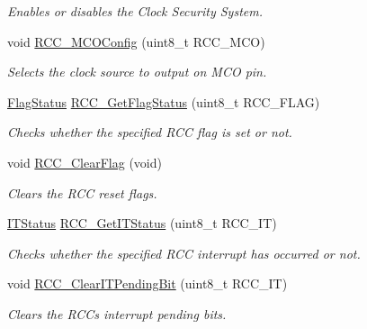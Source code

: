 \begin{DoxyCompactItemize}
\begin{DoxyCompactList}\small\item\em Enables or disables the Clock Security System. \end{DoxyCompactList}\item 
void \mbox{\hyperlink{group___r_c_c___private___functions_ga8f62b86c6ca8ae6585ba1cec79431fe5}{R\+C\+C\+\_\+\+M\+C\+O\+Config}} (uint8\+\_\+t R\+C\+C\+\_\+\+M\+CO)
\begin{DoxyCompactList}\small\item\em Selects the clock source to output on M\+CO pin. \end{DoxyCompactList}\item 
\mbox{\hyperlink{group___exported__types_ga89136caac2e14c55151f527ac02daaff}{Flag\+Status}} \mbox{\hyperlink{group___r_c_c___private___functions_ga2897bdc52f272031c44fb1f72205d295}{R\+C\+C\+\_\+\+Get\+Flag\+Status}} (uint8\+\_\+t R\+C\+C\+\_\+\+F\+L\+AG)
\begin{DoxyCompactList}\small\item\em Checks whether the specified R\+CC flag is set or not. \end{DoxyCompactList}\item 
void \mbox{\hyperlink{group___r_c_c___private___functions_ga53f909dbb15a54124419084ebda97d72}{R\+C\+C\+\_\+\+Clear\+Flag}} (void)
\begin{DoxyCompactList}\small\item\em Clears the R\+CC reset flags. \end{DoxyCompactList}\item 
\mbox{\hyperlink{group___exported__types_gaacbd7ed539db0aacd973a0f6eca34074}{I\+T\+Status}} \mbox{\hyperlink{group___r_c_c___private___functions_ga6126c99f398ee4be410ad76ae3aee18f}{R\+C\+C\+\_\+\+Get\+I\+T\+Status}} (uint8\+\_\+t R\+C\+C\+\_\+\+IT)
\begin{DoxyCompactList}\small\item\em Checks whether the specified R\+CC interrupt has occurred or not. \end{DoxyCompactList}\item 
void \mbox{\hyperlink{group___r_c_c___private___functions_ga529842d165910f8f87e26115da36089b}{R\+C\+C\+\_\+\+Clear\+I\+T\+Pending\+Bit}} (uint8\+\_\+t R\+C\+C\+\_\+\+IT)
\begin{DoxyCompactList}\small\item\em Clears the R\+CC\textquotesingle{}s interrupt pending bits. \end{DoxyCompactList}\end{DoxyCompactItemize}


